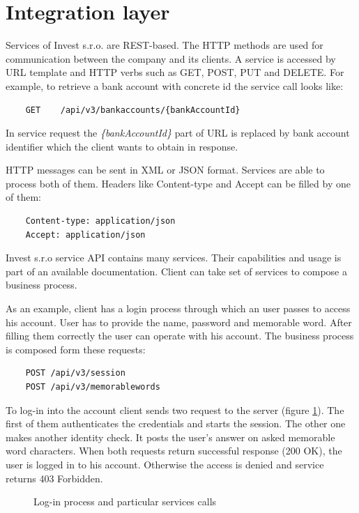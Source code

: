 \section{Integration layer}
Services of Invest s.r.o. are REST-based. The HTTP methods are used for communication between the company and its clients. A service is accessed by URL template and HTTP verbs such as GET, POST, PUT and DELETE. For example, to retrieve a bank account with concrete id the service call looks like: 

\begin{lstlisting}
    GET    /api/v3/bankaccounts/{bankAccountId}
\end{lstlisting}

In service request the \emph{\{bankAccountId\}} part of URL is replaced by bank account identifier which the client wants to obtain in response.

HTTP messages can be sent in XML or JSON format. Services are able to process both of them. Headers like Content-type and Accept can be filled by one of them:
 
\begin{lstlisting}
    Content-type: application/json
    Accept: application/json
\end{lstlisting}

Invest s.r.o service API contains many services. Their capabilities and usage is part of an available \gls{documentation}. Client can take set of services to compose a business process. 

As an example, client has a login process through which an user passes to access his account. User has to provide the name, password and memorable word. After filling them correctly the user can operate with his account. The business process is composed form these requests:

\begin{lstlisting}
    POST /api/v3/session
    POST /api/v3/memorablewords
\end{lstlisting}
  
To log-in into the account client sends two request to the server (figure \ref{fig:login-process}). The first of them authenticates the credentials and starts the \gls{session}. The other one makes another identity check. It posts the user's answer on asked memorable word characters. When both requests return successful response (200 OK), the user is logged in to his account. Otherwise the access is denied and service returns 403 Forbidden.

\begin{figure}[htp] 
\caption{Log-in process and particular services calls}
\label{fig:login-process}
\end{figure} 



